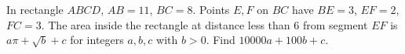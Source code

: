 In rectangle $ABCD$, $AB=11$, $BC=8$. Points $E,F$ on $BC$ have $BE=3$, $EF=2$, $FC=3$. The area inside the rectangle at distance less than 6 from segment $EF$ is $a\pi+\sqrt b+c$ for integers $a,b,c$ with $b>0$. Find $10000a+100b+c$.
